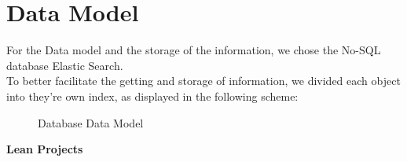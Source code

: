 \documentclass[a4paper,twoside,10pt]{report}
\begin{document}
\section{Data Model}
For the Data model and the storage of the information, we chose the No-SQL database Elastic Search.
\\ \newline
To better facilitate the getting and storage of information, we divided each object into they're own index, as displayed in the following scheme:
\newline
\begin{figure}[h!]
    \center
    \caption{Database Data Model}
\end{figure}
\newline
\textbf{Lean Projects}
\newline
\end{document}

